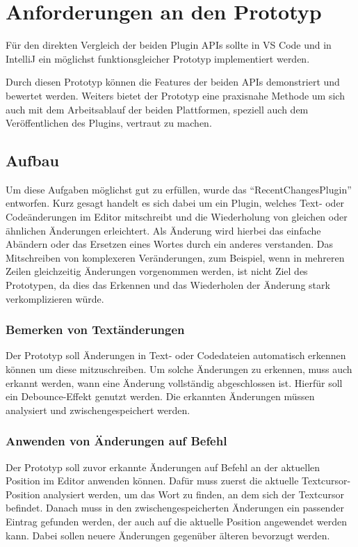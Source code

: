 \chapter{Anforderungen an den Prototyp}
\label{cha:Prototyp}

Für den direkten Vergleich der beiden Plugin APIs sollte 
in VS Code und in IntelliJ ein möglichst funktionsgleicher 
Prototyp implementiert werden.

Durch diesen Prototyp können die Features der beiden APIs 
demonstriert und bewertet werden. Weiters bietet der Prototyp
eine praxisnahe Methode um sich auch mit dem Arbeitsablauf der
beiden Plattformen, speziell auch dem Veröffentlichen
des Plugins, vertraut zu machen.

\section{Aufbau}
\label{sec:Prototyp_Aufbau}

Um diese Aufgaben möglichst gut zu erfüllen, wurde das
\enquote{RecentChangesPlugin} entworfen. Kurz gesagt handelt
es sich dabei um ein Plugin, welches Text- oder Codeänderungen 
im Editor mitschreibt und die Wiederholung von gleichen oder
ähnlichen Änderungen erleichtert.
Als Änderung wird hierbei das einfache Abändern oder das Ersetzen eines
Wortes durch ein anderes verstanden. 
Das Mitschreiben von komplexeren Veränderungen, zum Beispiel, 
wenn in mehreren Zeilen gleichzeitig Änderungen vorgenommen 
werden, ist nicht Ziel des Prototypen, da dies das Erkennen 
und das Wiederholen der Änderung stark verkomplizieren würde.

\subsection{Bemerken von Textänderungen}

Der Prototyp soll Änderungen in Text- oder Codedateien automatisch
erkennen können um diese mitzuschreiben. Um solche Änderungen
zu erkennen, muss auch erkannt werden, wann eine Änderung 
vollständig abgeschlossen ist. Hierfür
soll ein Debounce-Effekt %
genutzt werden. Die erkannten Änderungen 
müssen analysiert und zwischengespeichert werden.

\subsection{Anwenden von Änderungen auf Befehl}

Der Prototyp soll zuvor erkannte Änderungen auf Befehl an der
aktuellen Position im Editor anwenden können. Dafür muss zuerst die
aktuelle Textcursor-Position analysiert werden, um das Wort zu finden,
an dem sich der Textcursor befindet. Danach muss in den 
zwischengespeicherten Änderungen ein passender Eintrag gefunden werden,
der auch auf die aktuelle Position angewendet werden kann.
Dabei sollen neuere Änderungen gegenüber älteren bevorzugt werden.

